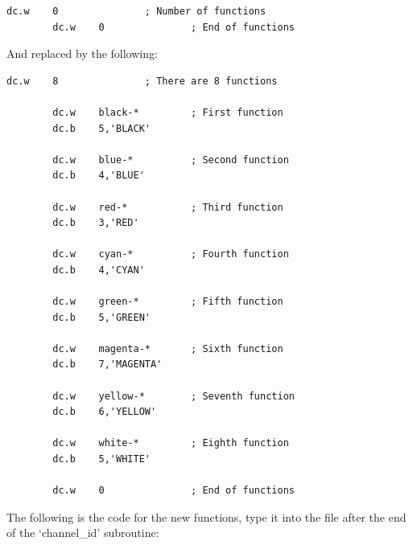 \begin{lstlisting}[firstnumber=1,caption={Colour Functions},label={lst:ColourFunctions}]
        dc.w    0               ; Number of functions
        dc.w    0               ; End of functions
\end{lstlisting}

And replaced by the following:

\begin{lstlisting}[firstnumber=1,caption={Colour Functions},label={lst:ColourFunctions}]
        dc.w    8               ; There are 8 functions

        dc.w    black-*         ; First function
        dc.b    5,'BLACK'

        dc.w    blue-*          ; Second function
        dc.b    4,'BLUE'

        dc.w    red-*           ; Third function
        dc.b    3,'RED'

        dc.w    cyan-*          ; Fourth function
        dc.b    4,'CYAN'

        dc.w    green-*         ; Fifth function
        dc.b    5,'GREEN'

        dc.w    magenta-*       ; Sixth function
        dc.b    7,'MAGENTA'

        dc.w    yellow-*        ; Seventh function
        dc.b    6,'YELLOW'

        dc.w    white-*         ; Eighth function
        dc.b    5,'WHITE'

        dc.w    0               ; End of functions
\end{lstlisting}

The following is the code for the new functions, type it into the
    file after the end of the `channel\_id' subroutine:

